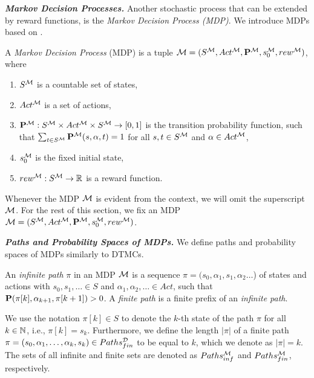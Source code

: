 \emph{\textbf{Markov Decision Processes.}} Another stochastic process that can be extended by reward functions, is the \textit{Markov Decision Process (MDP)}. We introduce MDPs based on \cite{Bibel}.
\begin{definition}\label{def:MDP}
    A \textit{Markov Decision Process} (MDP) is a tuple $\mathcal{M} = (S^{\mathcal{M}},Act^{\mathcal{M}},\mathbf{P}^{\mathcal{M}},s_0^{\mathcal{M}},rew^{\mathcal{M}})$, where
    \begin{enumerate}[label=(\roman*)]
        \item $S^{\mathcal{M}}$ is a countable set of states,
        \item $Act^{\mathcal{M}}$ is a set of actions,
        \item $\mathbf{P}^{\mathcal{M}}: S^{\mathcal{M}}\times Act^{\mathcal{M}}\times S^{\mathcal{M}} \rightarrow [0,1]$ is the transition probability function, such that $\sum_{t\in S^{\mathcal{M}}}\mathbf{P}^{\mathcal{M}}(s,\alpha, t) = 1$ for all $s,t\in S^{\mathcal{M}}$ and $\alpha\in Act^{\mathcal{M}}$,
        \item $s_0^{\mathcal{M}}$ is the fixed initial state,
        \item $rew^{\mathcal{M}}: S^{\mathcal{M}} \rightarrow\mathbb{R}$ is a reward function.
    \end{enumerate}
\end{definition}
Whenever the MDP $\mathcal{M}$ is evident from the context, we will omit the superscript $\mathcal{M}$. For the rest of this section, we fix an MDP $\mathcal{M} = (S^{\mathcal{M}},Act^{\mathcal{M}},\mathbf{P}^{\mathcal{M}},s_0^{\mathcal{M}},rew^{\mathcal{M}})$.

\emph{\textbf{Paths and Probability Spaces of MDPs.}} We define paths and probability spaces of MDPs similarly to DTMCs.

\begin{definition}
    An \textit{infinite path} $\pi$ in an MDP $\mathcal{M}$ is a sequence $\pi = (s_0,\alpha_1, s_1, \alpha_2 \ldots$) of states and actions with $s_0,s_1,\ldots \in S$ and $\alpha_1,\alpha_2,\ldots \in Act$, such that $\mathbf{P}(\pi[k],\alpha_{k+1},\pi[k+1]) > 0$. A \textit{finite path} is a finite prefix of an \textit{infinite path}.
\end{definition}

We use the notation $\pi[k]\in S$ to denote the $k$-th state of the path $\pi$ for all $k\in \mathbb{N}$, i.e., $\pi[k] = s_k$. Furthermore, we define the length $|\pi|$ of a finite path $\pi = (s_0,\alpha_1,\dots,\alpha_{k},s_k) \in Paths_{fin}^{\mathcal{D}}$ to be equal to $k$, which we denote as $|\pi| = k$. 
The sets of all infinite and finite sets are denoted as $Paths_{inf}^{\mathcal{M}}$ and $Paths_{fin}^{\mathcal{M}}$, respectively.

